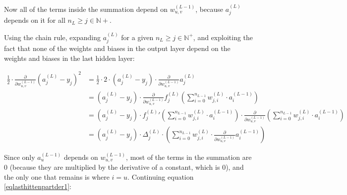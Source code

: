 \documentclass[titlepage]{article}
\begin{document}
          Now all of the terms inside the summation depend on
          $w_{u,v}^{(L-1)}$, because $a_j^{(L)}$ depends on it for
          all $n_L \geq j \in \mathbb{N}+$.

          Using the chain rule, expanding $a_j^{(L)}$ for a given
          $n_L \geq j \in \mathbb{N}^+$, and exploiting the fact that none of
          the weights and biases in the output layer depend on the weights and
          biases in the last hidden layer:

          \begin{equation}\label{eqlasthittenpartder1}
            \begin{split}
              \frac{1}{2}
              \cdot
              \frac{\partial}{\partial w_{u,v}^{(L-1)}}
                \left( a_j^{(L)} - y_j \right)^2
                & = \frac{1}{2}
                    \cdot
                    2
                    \cdot
                    \left( a_j^{(L)} - y_j \right)
                    \cdot
                    \frac{\partial}{\partial w_{u,v}^{(L-1)}}
                      a_j^{(L)} \\
                & = \left( a_j^{(L)} - y_j \right)
                    \cdot
                    \frac{\partial}{\partial w_{u,v}^{(L-1)}}
                      f_j^{(L)} \left(
                        \sum_{i=0}^{n_{L-1}} w_{j,i}^{(L)} \cdot a_i^{(L-1)}
                      \right) \\
                & = \left( a_j^{(L)} - y_j \right)
                    \cdot
                    {f_j^{(L)}}' \left(
                      \sum_{i=0}^{n_{L-1}} w_{j,i}^{(L)} \cdot a_i^{(L-1)}
                    \right)
                    \cdot
                    \frac{\partial}{\partial w_{u,v}^{(L-1)}}
                      \left(
                        \sum_{i=0}^{n_{L-1}} w_{j,i}^{(L)} \cdot a_i^{(L-1)}
                      \right) \\
                & = \left( a_j^{(L)} - y_j \right)
                    \cdot
                    \Delta_j^{(L)}
                    \cdot
                    \left(
                      \sum_{i=0}^{n_{L-1}}
                        w_{j,i}^{(L)}
                        \cdot
                        \frac{\partial}{\partial w_{u,v}^{(L-1)}}
                          a_i^{(L-1)}
                    \right)
            \end{split}
          \end{equation}

          Since only $a_{u}^{(L-1)}$ depends on $w_{u,v}^{(L-1)}$, most of the
          terms in the summation are $0$ (because they are multiplied by the
          derivative of a constant, which is $0$), and the only one that remains
          is where $i = u$. Continuing equation \ref{eqlasthittenpartder1}:
\end{document}
